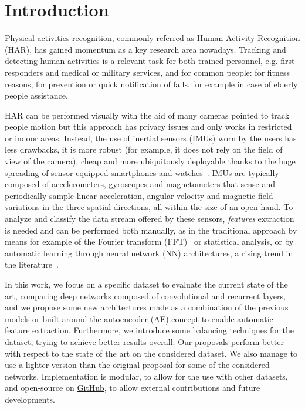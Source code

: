 
\section{Introduction}
\label{sec:introduction}


Physical activities recognition, commonly referred as Human Activity Recognition (HAR), has gained momentum as a key research area nowadays.
Tracking and detecting human activities is a relevant task for both trained personnel, e.g. first responders and medical or military services, and for common people: for fitness reasons, for prevention or quick notification of falls, for example in case of elderly people assistance.%

HAR can be performed visually with the aid of many cameras pointed to track people motion but this approach has privacy issues and only works in restricted or indoor areas.
Instead, the use of inertial sensors (IMUs) worn by the users has less drawbacks, it is more robust (for example, it does not rely on the field of view of the camera), cheap and more ubiquitously deployable thanks to the huge spreading of sensor-equipped smartphones and watches~\cite{Wang-survey}.
IMUs are typically composed of accelerometers, gyroscopes and magnetometers that sense and periodically sample linear acceleration, angular velocity and magnetic field variations in the three spatial directions, all within the size of an open hand.
To analyze and classify the data stream offered by these sensors, \textit{features} extraction is needed and can be performed both manually, as in the traditional approach by means for example of the Fourier transform (FFT)~\cite{FrankNadales} or statistical analysis, or by automatic learning through neural network (NN) architectures, a rising trend in the literature~\cite{Wang-survey}.

In this work, we focus on a specific dataset to evaluate the current state of the art, comparing deep networks composed of convolutional and recurrent layers, and we propose some new architectures made as a combination of the previous models or built around the autoencoder (AE) concept to enable automatic feature extraction.
Furthermore, we introduce some balancing techniques for the dataset, trying to achieve better results overall.
Our proposals perform better with respect to the state of the art on the considered dataset.
We also manage to use a lighter version than the original proposal for some of the considered networks. 
Implementation is modular, to allow for the use with other datasets, and open-source on \href{https://github.com/eliabntt/hda-project}{GitHub}, to allow external contributions and future developments.

